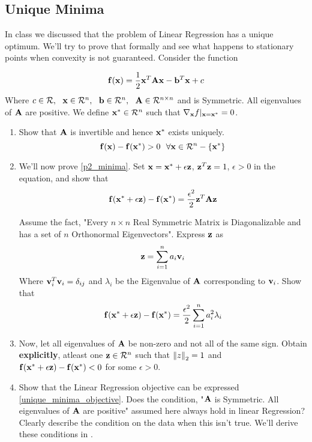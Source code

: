 \subsection{Unique Minima}\label{prob:unique_minima}
In class we discussed that the problem of Linear Regression has a unique optimum. We'll try to prove that formally and see what happens to stationary points when convexity is not guaranteed. Consider the function

\begin{equation}\label{unique_minima_objective}
\mathbf{f}(\mathbf{x}) = \frac{1}{2} \mathbf{x}^T \mathbf{A} \mathbf{x} - \mathbf{b}^   T\mathbf{x} + c 
\end{equation}
Where $c\in \mathcal{R}, \ \  \mathbf{x}  \in \mathcal{R}^n, \ \ \mathbf{b} \in \mathcal{R}^n, \ \ \mathbf{A} \in \mathcal{R}^{n \times n}$ and is Symmetric. All eigenvalues of $\mathbf{A}$ are positive. We define $\mathbf{x}^* \in \mathcal{R}^n$ such that $\nabla_{\mathbf{x}} f |_{\mathbf{x} = \mathbf{x} ^ *} = 0$.

\begin{enumerate}[label=\alph*)]
\item Show that $\mathbf{A}$ is invertible and hence $\mathbf{x}^*$ exists uniquely.
\begin{equation} \label{p2_minima}
    \mathbf{f}(\mathbf{x}) - \mathbf{f}(\mathbf{x}^*) > 0 \ \ \forall \mathbf{x} \in \mathcal{R}^n  -  \{\mathbf{x}^*\}
\end{equation}
\item  We'll now prove \autoref{p2_minima}. Set $\mathbf{x} = \mathbf{x}^* + \epsilon \mathbf{z}$, $\mathbf{z}^T\mathbf{z} = 1$, $\epsilon > 0$  in the equation, and show that
\begin{equation}
      \mathbf{f}(\mathbf{x}^* + \epsilon\mathbf{z}) - \mathbf{f}(\mathbf{x}^*) = \frac{\epsilon^2}{2}\mathbf{z}^T\mathbf{A} \mathbf{z}
\end{equation}

Assume the fact, "Every $n \times n$ Real Symmetric Matrix is Diagonalizable and has a set of $n$ Orthonormal Eigenvectors". Express $\mathbf{z}$ as
\begin{equation*}
    \mathbf{z} = \sum_{i = 1}^{n} a_i \mathbf{v}_i
\end{equation*}
Where $\mathbf{v}_i^T\mathbf{v}_i = \delta_{ij}$ and $\lambda_i$ be the Eigenvalue of $\mathbf{A}$ corresponding to $\mathbf{v}_i$. Show that
\begin{equation}
      \mathbf{f}(\mathbf{x}^* + \epsilon\mathbf{z}) - \mathbf{f}(\mathbf{x}^*) = \frac{\epsilon^2}{2}\sum_{i = 1}^{n} a_i^2 \lambda_i
\end{equation}


\item Now, let all eigenvalues of $\mathbf{A}$ be non-zero and not all of the same sign. Obtain \textbf{explicitly}, atleast one $\mathbf{z} \in \mathcal{R}^n$ such that  $\left\lVert z\right\rVert_2 = 1$ and $\mathbf{f}(\mathbf{x}^* + \epsilon \mathbf{z}) - \mathbf{f}(\mathbf{x}^*) < 0$ for some $\epsilon > 0$.

\item Show that the Linear Regression objective can be expressed \autoref{unique_minima_objective}. Does the condition, "$\mathbf{A}$ is Symmetric. All eigenvalues of $\mathbf{A}$ are positive" assumed here always hold in linear Regression? Clearly describe the condition on the data when this isn't true. We'll derive these conditions in .
\end{enumerate}

